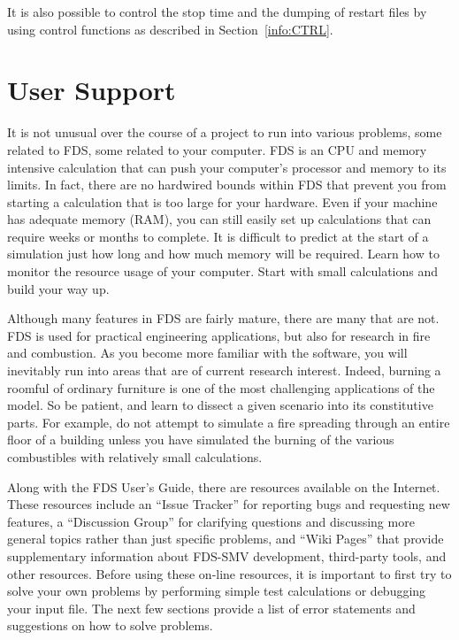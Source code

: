 \documentclass[11pt]{book}
\begin{document}
It is also possible to control the stop time and the dumping of restart files by using
control functions as described in Section~\ref{info:CTRL}.





\chapter{User Support}

It is not unusual over the course of a
project to run into various problems, some related to FDS, some related to your computer.
FDS is an CPU and memory intensive calculation that can push your computer's
processor and memory to its limits. In fact, there are no hardwired bounds within FDS that
prevent you from starting a calculation that is too large for your hardware.
Even if your machine has adequate memory (RAM), you can still easily set up calculations that can require
weeks or months to complete. It is difficult to predict at the start of a simulation just how long and
how much memory will be required. Learn how to monitor the resource usage of your computer.
Start with small calculations and build your way up.

Although many features in FDS are fairly mature, there are many that are not. FDS is used for
practical engineering applications, but also for research in fire and combustion. As you become
more familiar with the software, you will inevitably run into areas that are of current research
interest. Indeed, burning a roomful of ordinary furniture is one of the most challenging applications
of the model. So be patient, and learn to dissect a given scenario into its constitutive parts.
For example, do not attempt to simulate a fire spreading through an entire floor of a
building unless you have simulated the burning of the various combustibles with relatively small calculations.

Along with the FDS User's Guide, there are resources available on the Internet.
These resources include an ``Issue Tracker'' for reporting bugs and requesting new features,
a ``Discussion Group'' for clarifying questions and discussing more general
topics rather than just specific problems, and ``Wiki Pages'' that provide supplementary information
about FDS-SMV development, third-party tools, and other resources.
Before using these on-line resources, it is important to first try to solve your own
problems by performing simple test calculations or debugging your input file. The next few sections
provide a list of error statements and suggestions on how to solve problems.
\end{document}
